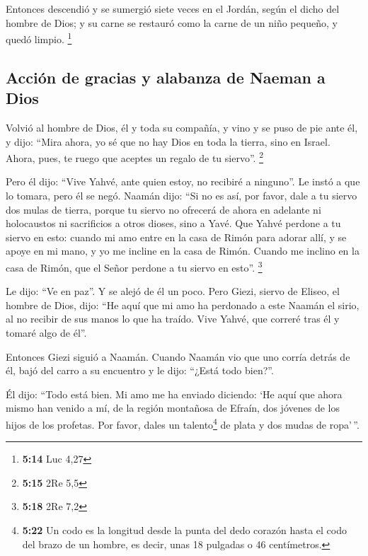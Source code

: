 \begin{paracol}{2}
 Entonces descendió y se sumergió siete veces en el
Jordán, según el dicho del hombre de Dios; y su carne se restauró como
la carne de un niño pequeño, y quedó limpio. \footnote{\textbf{5:14} Luc
  4,27}

\hypertarget{acciuxf3n-de-gracias-y-alabanza-de-naeman-a-dios}{%
\subsection{Acción de gracias y alabanza de Naeman a
Dios}\label{acciuxf3n-de-gracias-y-alabanza-de-naeman-a-dios}}

 Volvió al hombre de Dios, él y toda su compañía, y vino
y se puso de pie ante él, y dijo: ``Mira ahora, yo sé que no hay Dios en
toda la tierra, sino en Israel. Ahora, pues, te ruego que aceptes un
regalo de tu siervo''. \footnote{\textbf{5:15} 2Re 5,5}

 Pero él dijo: ``Vive Yahvé, ante quien estoy, no
recibiré a ninguno''. Le instó a que lo tomara, pero él se negó.
 Naamán dijo: ``Si no es así, por favor, dale a tu siervo
dos mulas de tierra, porque tu siervo no ofrecerá de ahora en adelante
ni holocaustos ni sacrificios a otros dioses, sino a Yavé.
 Que Yahvé perdone a tu siervo en esto: cuando mi amo
entre en la casa de Rimón para adorar allí, y se apoye en mi mano, y yo
me incline en la casa de Rimón. Cuando me inclino en la casa de Rimón,
que el Señor perdone a tu siervo en esto''. \footnote{\textbf{5:18} 2Re
  7,2}

 Le dijo: ``Ve en paz''. Y se alejó de él un poco.
 Pero Giezi, siervo de Eliseo, el hombre de Dios, dijo:
``He aquí que mi amo ha perdonado a este Naamán el sirio, al no recibir
de sus manos lo que ha traído. Vive Yahvé, que correré tras él y tomaré
algo de él''.

 Entonces Giezi siguió a Naamán. Cuando Naamán vio que
uno corría detrás de él, bajó del carro a su encuentro y le dijo:
``¿Está todo bien?''.

 Él dijo: ``Todo está bien. Mi amo me ha enviado
diciendo: `He aquí que ahora mismo han venido a mí, de la región
montañosa de Efraín, dos jóvenes de los hijos de los profetas. Por
favor, dales un talento\footnote{\textbf{5:22} Un codo es la longitud
  desde la punta del dedo corazón hasta el codo del brazo de un hombre,
  es decir, unas 18 pulgadas o 46 centímetros.} de plata y dos mudas de
ropa'\,''.


\end{paracol}
